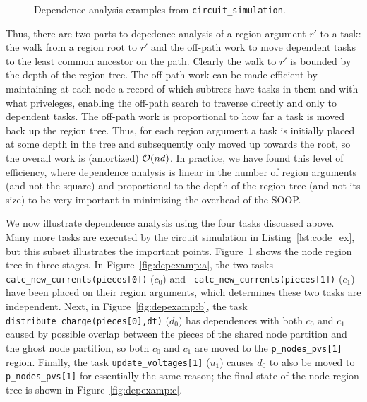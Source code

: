 \begin{figure}
\centering
{}
\label{fig:depexamp}
\caption{Dependence analysis examples from {\tt circuit\_simulation}.}
\end{figure}

Thus, there are two parts to depedence analysis of a region argument
$r'$ to a task: the walk from a region root to $r'$ and the off-path work
to move dependent tasks to the least common ancestor on the path.
Clearly the walk to $r'$ is bounded by the depth of the region tree.
The off-path work can be made efficient by maintaining at each node a
record of which subtrees have tasks in them and with what priveleges,
enabling the off-path search to traverse directly and only to
dependent tasks.  The off-path work is proportional to how far a task
is moved back up the region tree.  Thus, for each region argument a
task is initially placed at some depth in the tree and subsequently
only moved up towards the root, so the overall work is (amortized)
${\cal O}(nd)$.  In practice, we have found this level of efficiency,
where dependence analysis is linear in the number of region arguments (and not
the square) and proportional to the depth of the region tree (and not its size)
to be very important in minimizing the overhead of the SOOP.

We now illustrate dependence analysis using the four tasks discussed
above.  Many more tasks are executed by the circuit simulation in Listing~\ref{lst:code_ex},
but this subset illustrates the important
points. Figure~\ref{fig:depexamp} shows the node region tree in three
stages.  In Figure~\ref{fig:depexamp:a}, the two tasks
{\tt calc\_new\_currents(pieces[0])} ($c_0$) and {\tt
    calc\_new\_currents(pieces[1])} ($c_1$) have been placed on their region arguments,
  which determines these two tasks are independent.
Next, in Figure~\ref{fig:depexamp:b}, the task {\tt distribute\_charge(pieces[0],dt)} ($d_0$)
has dependences with both $c_0$ and $c_1$ caused by possible overlap between the pieces of the
shared node partition and the ghost node partition, so both $c_0$ and $c_1$ are moved to
the {\tt p\_nodes\_pvs[1]} region.  Finally, the task {\tt update\_voltages[1]} ($u_1$) causes
$d_0$ to also be moved to {\tt p\_nodes\_pvs[1]} for essentially the same reason; the final
state of the node region tree is shown in Figure~\ref{fig:depexamp:c}.
  
